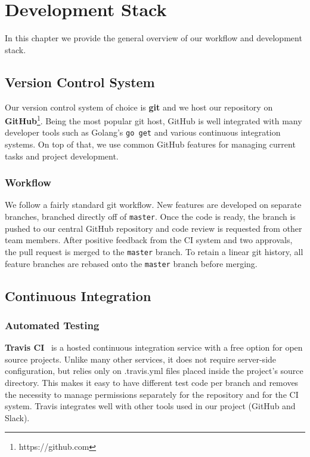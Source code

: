\chapter{Development Stack}

In this chapter we provide the general overview of our workflow and
development stack.

\section{Version Control System}
Our version control system of choice is \textbf{git} and we host our repository on
\textbf{GitHub}\footnote{https://github.com}. Being the most popular git host,
GitHub is well integrated  with many developer tools such as Golang's
\texttt{go get} and various continuous integration systems. On top of that,
we use common GitHub features for managing current tasks and project development.

\subsection{Workflow}
We follow a fairly standard git workflow. New features are developed on
separate branches, branched directly off of \texttt{master}. Once the code
is ready, the branch is pushed to our central GitHub repository and code
review is requested from other team members. After positive feedback from
the CI system and two approvals, the pull request is merged to the
\texttt{master} branch. To retain a linear git history, all feature branches
are rebased onto the \texttt{master} branch before merging.

\section{Continuous Integration}

\subsection{Automated Testing}
\textbf{Travis CI}~\cite{travis} is a hosted continuous integration service with
a free option for open source projects.
Unlike many other services, it does not require server-side
configuration, but relies only on .travis.yml files placed inside
the project's source directory. This makes it easy to have different test
code per branch and removes the necessity to manage permissions separately
for the repository and for the CI system. Travis integrates well with other
tools used in our project (GitHub and Slack).

